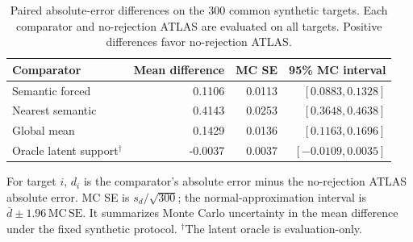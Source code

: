 \begin{table}[H]
\centering
\small
\caption{Paired absolute-error differences on the 300 common synthetic targets. Each comparator and no-rejection ATLAS are evaluated on all targets. Positive differences favor no-rejection ATLAS.}
\label{tab:v1-app-paired-comparison}
\begin{tabular}{lrrr}
\toprule
Comparator & Mean difference & MC SE & 95\% MC interval \\
\midrule
Semantic forced & 0.1106 & 0.0113 & $[0.0883, 0.1328]$ \\
Nearest semantic & 0.4143 & 0.0253 & $[0.3648, 0.4638]$ \\
Global mean & 0.1429 & 0.0136 & $[0.1163, 0.1696]$ \\
Oracle latent support$^{\dagger}$ & -0.0037 & 0.0037 & $[-0.0109, 0.0035]$ \\
\bottomrule
\end{tabular}
\par\smallskip
\begin{minipage}{0.96\linewidth}\footnotesize
For target $i$, $d_i$ is the comparator's absolute error minus the no-rejection ATLAS absolute error. MC SE is $s_d/\sqrt{300}$; the normal-approximation interval is $\bar d\pm1.96\,\mathrm{MC\,SE}$. It summarizes Monte Carlo uncertainty in the mean difference under the fixed synthetic protocol. $^{\dagger}$The latent oracle is evaluation-only.
\end{minipage}
\end{table}

